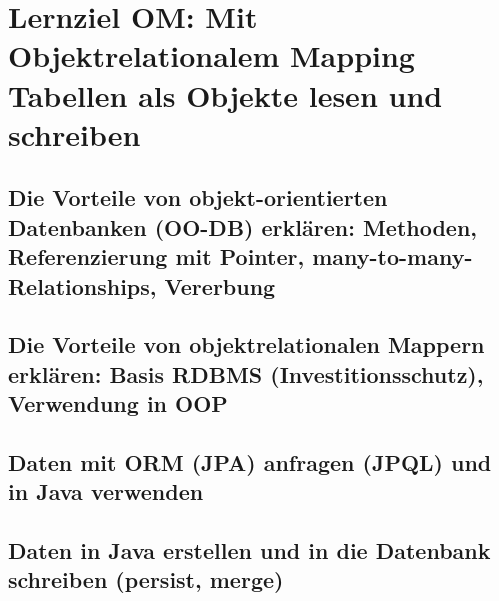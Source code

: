 \section{Lernziel OM: Mit Objektrelationalem Mapping Tabellen als Objekte lesen und schreiben}

\subsection{Die Vorteile von objekt-orientierten Datenbanken (OO-DB) erklären: Methoden, Referenzierung mit Pointer, many-to-many-Relationships, Vererbung}

\subsection{Die Vorteile von objektrelationalen Mappern erklären: Basis RDBMS (Investitionsschutz), Verwendung in OOP}

\subsection{Daten mit ORM (JPA) anfragen (JPQL) und in Java verwenden}

\subsection{Daten in Java erstellen und in die Datenbank schreiben (persist, merge)}